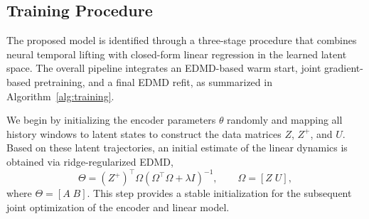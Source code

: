\documentclass[journal]{IEEEtran}
\begin{document}
\subsection{Training Procedure}
\label{sec:training}

The proposed model is identified through a three-stage procedure that combines neural temporal lifting with closed-form linear regression in the learned latent space. The overall pipeline integrates an EDMD-based warm start, joint gradient-based pretraining, and a final EDMD refit, as summarized in Algorithm~\ref{alg:training}.

We begin by initializing the encoder parameters $\theta$ randomly and mapping all history windows to latent states to construct the data matrices $Z$, $Z^{+}$, and $U$. Based on these latent trajectories, an initial estimate of the linear dynamics is obtained via ridge-regularized EDMD,
\begin{equation}
    \Theta = (Z^{+})^\top \Omega \left(\Omega^\top \Omega + \lambda I\right)^{-1},
    \qquad
    \Omega = [Z\;U],
    \label{eq:edmd_solution}
\end{equation}
where $\Theta = [A\;B]$. This step provides a stable initialization for the subsequent joint optimization of the encoder and linear model.
\end{document}
